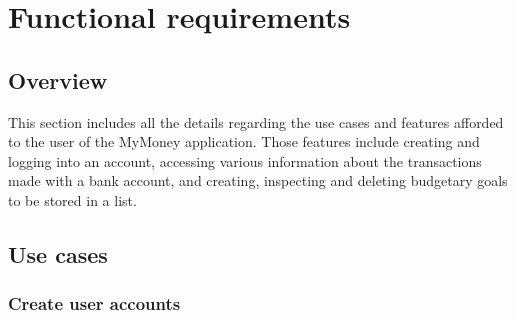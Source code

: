 \documentclass[letterpaper]{article}
\begin{document}
\section{Functional requirements}

	\subsection{Overview}
	
		This section includes all the details regarding the use cases and features afforded to the user of the MyMoney application. Those features include creating and logging into an account, accessing various information about the transactions made with a bank account, and creating, inspecting and deleting budgetary goals to be stored in a list.
	
	\subsection{Use cases}
	
		\subsubsection{Create user accounts}
		
\end{document}
